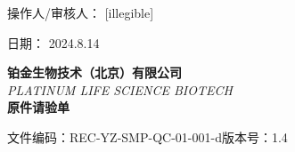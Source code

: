 \documentclass[UTF8,10pt,a4paper,fontset=fandol]{ctexart}
\newcommand{\fieldvalue}[1]{#1}
\newcommand{\handwritten}[1]{#1}
\begin{document}
\vfill

\noindent
操作人/审核人：
\fieldvalue{\handwritten{[illegible]}}

\hfill
日期：
\fieldvalue{\handwritten{2024.8.14}}

\newpage

\begin{center}
\textbf{铂金生物技术（北京）有限公司}\\
\textit{PLATINUM LIFE SCIENCE BIOTECH}\\[2pt]
\textbf{原件请验单}
\end{center}

\noindent
文件编码：REC-YZ-SMP-QC-01-001-d\hfill 版本号：1.4

\vspace{4pt}
\end{document}
